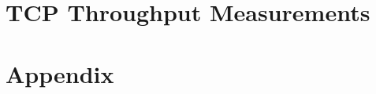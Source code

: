 \documentclass[a4paper,12pt,twoside]{article}
\begin{document}
\section{TCP Throughput Measurements}
\label{sec:tp-measurements}


\section{Appendix}



%



\backmatter


%
\end{document}
